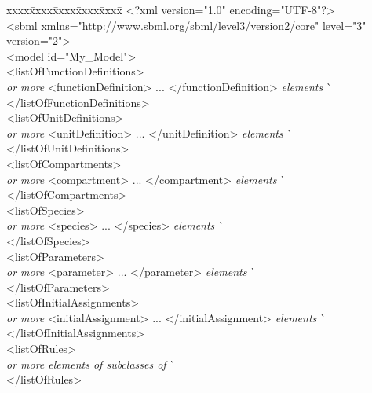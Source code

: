 \vspace*{2ex}
\begin{tt}
  \renewcommand{\baselinestretch}{0.82}
  \small
  \begin{tabbing}
xxxx\=xxxx\=xxxx\=xxxx\=xxxx\=\kill
\+\>
<?xml version="1.0" encoding="UTF-8"?>\\
<sbml xmlns="http://www.sbml.org/sbml/level3/version2/core" level="3" version="2">\\
\><model id="My\_Model">\\
\>\><listOfFunctionDefinitions>\\
\>\>\>\textrm{\emph{ or more}} <functionDefinition> ... </functionDefinition> \textrm{\emph{elements}}  \` \sayOptional\\
\>\></listOfFunctionDefinitions>\\
\>\><listOfUnitDefinitions>\\
\>\>\>\textrm{\emph{ or more}} <unitDefinition> ... </unitDefinition> \textrm{\emph{elements}}  \` \sayOptional\\
\>\></listOfUnitDefinitions>\\
\>\><listOfCompartments>\\
\>\>\>\textrm{\emph{ or more}} <compartment> ... </compartment> \textrm{\emph{elements}}  \` \sayOptional\\
\>\></listOfCompartments>\\
\>\><listOfSpecies>\\
\>\>\>\textrm{\emph{ or more}} <species> ... </species> \textrm{\emph{elements}}  \` \sayOptional\\
\>\></listOfSpecies>\\
\>\><listOfParameters>\\
\>\>\>\textrm{\emph{ or more}} <parameter> ... </parameter> \textrm{\emph{elements}}  \` \sayOptional\\
\>\></listOfParameters>\\
\>\><listOfInitialAssignments>\\
\>\>\>\textrm{\emph{ or more}} <initialAssignment> ... </initialAssignment> \textrm{\emph{elements}}  \` \sayOptional\\
\>\></listOfInitialAssignments>\\
\>\><listOfRules>\\
\>\>\>\textrm{\emph{ or more elements of subclasses of }}  \` \sayOptional\\
\>\></listOfRules>\\

\end{tabbing}
\end{tt}
